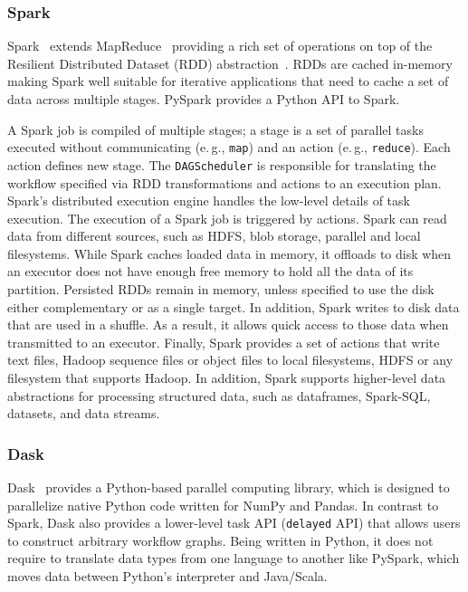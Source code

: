 \subsubsection*{Spark}
Spark~\cite{zaharia2010spark} extends MapReduce~\cite{dean2004mapreduce} providing a rich set of operations on top of the Resilient Distributed Dataset (RDD) abstraction~\cite{zaharia2012resilient}.
RDDs are cached in-memory making Spark well suitable for iterative applications that need to cache a set of data across multiple stages.
PySpark provides a Python API to Spark.

A Spark job is compiled of multiple stages; a stage is a set of parallel tasks executed without communicating (e.\,g., \texttt{map}) and an action (e.\,g., \texttt{reduce}).
Each action defines new stage.
The \texttt{DAGScheduler} is responsible for translating the workflow specified via RDD transformations and actions to an execution plan.
Spark's distributed execution engine handles the low-level details of task execution.
The execution of a Spark job is triggered by actions.
Spark can read data from different sources, such as HDFS, blob storage, parallel and local filesystems.
While Spark caches loaded data in memory, it offloads to disk when an executor does not have enough free memory to hold all the data of its partition.
Persisted RDDs remain in memory, unless specified to use the disk either complementary or as a single target.
In addition, Spark writes to disk data that are used in a shuffle.
As a result, it allows quick access to those data when transmitted to an executor.
Finally, Spark provides a set of actions that write text files, Hadoop sequence files or object files to local filesystems, HDFS or any filesystem that supports Hadoop.
In addition, Spark supports higher-level data abstractions for processing structured data, such as dataframes, Spark-SQL, datasets, and data streams.

\subsubsection*{Dask}
Dask~\cite{rocklin2015dask} provides a Python-based parallel computing library, which is designed to parallelize native Python code written for NumPy and Pandas.
In contrast to Spark, Dask also provides a lower-level task API (\texttt{delayed} API) that allows users to construct arbitrary workflow graphs.
Being written in Python, it does not require to translate data 
types from one language to another like PySpark, which moves data between Python's interpreter and Java/Scala.

